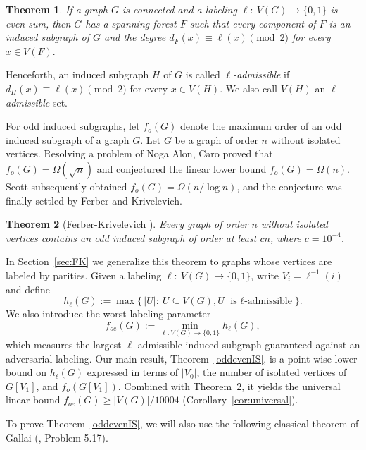 \documentclass{article}
\newcommand{\2}{\vspace{0.2cm}}
\newtheorem{theorem}{Theorem}[section]
\begin{document}
\begin{theorem}\label{thm:GY}
If a graph $G$ is connected and a labeling $\ell:\ V(G)\to \{0,1\}$ is even-sum, 
then $G$ has a spanning forest $F$ such that every component of $F$ is an induced subgraph of $G$ and 
the degree $d_F(x)\equiv \ell(x) {\pmod 2}$ for every $x\in V(F).$ 
\end{theorem}

Henceforth, an induced subgraph $H$ of $G$ is called {\em $\ell$-admissible} if $d_H(x)\equiv \ell(x) {\pmod 2}$ for every $x\in V(H).$
We also call $V(H)$ an {\em $\ell$-admissible} set. 

For odd induced subgraphs, let $f_o(G)$ denote the maximum order of an odd induced subgraph of a graph $G$.
Let $G$ be a graph of order $n$ without isolated vertices. Resolving a problem of Noga Alon, Caro \cite{Caro1994} proved that $f_o(G)=\Omega(\sqrt{n})$ and conjectured the linear lower bound $f_o(G)=\Omega(n)$. Scott \cite{Scott1992} subsequently obtained $f_o(G)=\Omega(n/\log n)$, and the conjecture was finally settled by Ferber and Krivelevich.

\begin{theorem}[Ferber-Krivelevich \cite{FK}]\label{thm: os linear bound}
Every graph of order $n$ without isolated vertices contains an odd induced subgraph of order at least $cn$, where $c=10^{-4}$.
\end{theorem}

In Section~\ref{sec:FK} we generalize this theorem to graphs whose vertices are labeled by parities. 
Given a labeling $\ell:\ V(G)\to\{0,1\}$, write $V_i=\ell^{-1}(i)$ and define
$$
h_{\ell}(G):=\max\bigl\{\,|U|:\ U\subseteq V(G), U \mbox{ is $\ell$-admissible}\bigr\}.
$$
We also introduce the worst-labeling parameter
$$
f_{oe}(G):=\min_{\ell: V(G)\to\{0,1\}} h_{\ell}(G),
$$
which measures the largest $\ell$-admissible induced subgraph guaranteed against an adversarial labeling. 
Our main result, Theorem~\ref{oddevenIS}, is a point-wise lower bound on $h_{\ell}(G)$ expressed in terms of $|V_0|$, the number of isolated vertices of $G[V_1]$, and $f_o(G[V_1])$. Combined with Theorem~\ref{thm: os linear bound}, it yields the universal linear bound $f_{oe}(G)\ge |V(G)|/10004$ (Corollary~\ref{cor:universal}).


To prove Theorem~\ref{oddevenIS}, we will also use the following
classical theorem of Gallai (\cite{L1993}, Problem 5.17). 
\end{document}
